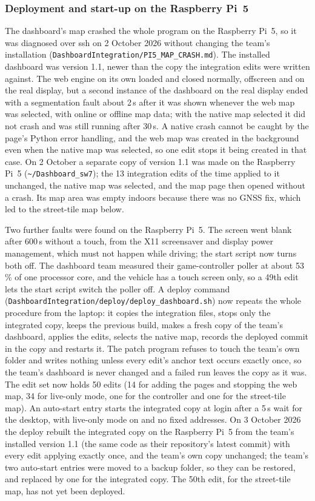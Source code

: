 \subsubsection*{Deployment and start-up on the Raspberry Pi~5}
\label{sec:pi5-deploy}
The dashboard's map crashed the whole program on the Raspberry Pi~5, so it was diagnosed over ssh on 2 October 2026 without changing the team's installation (\texttt{DashboardIntegration/PI5\_MAP\_CRASH.md}). The installed dashboard was version 1.1, newer than the copy the integration edits were written against. The web engine on its own loaded and closed normally, offscreen and on the real display, but a second instance of the dashboard on the real display ended with a segmentation fault about 2\,s after it was shown whenever the web map was selected, with online or offline map data; with the native map selected it did not crash and was still running after 30\,s. A native crash cannot be caught by the page's Python error handling, and the web map was created in the background even when the native map was selected, so one edit stops it being created in that case. On 2 October a separate copy of version 1.1 was made on the Raspberry Pi~5 (\texttt{\textasciitilde/Dashboard\_sw7}); the 13 integration edits of the time applied to it unchanged, the native map was selected, and the map page then opened without a crash. Its map area was empty indoors because there was no GNSS fix, which led to the street-tile map below.

Two further faults were found on the Raspberry Pi~5. The screen went blank after 600\,s without a touch, from the X11 screensaver and display power management, which must not happen while driving; the start script now turns both off. The dashboard team measured their game-controller poller at about 53\,\% of one processor core, and the vehicle has a touch screen only, so a 49th edit lets the start script switch the poller off. A deploy command (\texttt{DashboardIntegration/deploy/deploy\_dashboard.sh}) now repeats the whole procedure from the laptop: it copies the integration files, stops only the integrated copy, keeps the previous build, makes a fresh copy of the team's dashboard, applies the edits, selects the native map, records the deployed commit in the copy and restarts it. The patch program refuses to touch the team's own folder and writes nothing unless every edit's anchor text occurs exactly once, so the team's dashboard is never changed and a failed run leaves the copy as it was. The edit set now holds 50 edits (14 for adding the pages and stopping the web map, 34 for live-only mode, one for the controller and one for the street-tile map). An auto-start entry starts the integrated copy at login after a 5\,s wait for the desktop, with live-only mode on and no fixed addresses. On 3 October 2026 the deploy rebuilt the integrated copy on the Raspberry Pi~5 from the team's installed version 1.1 (the same code as their repository's latest commit) with every edit applying exactly once, and the team's own copy unchanged; the team's two auto-start entries were moved to a backup folder, so they can be restored, and replaced by one for the integrated copy. The 50th edit, for the street-tile map, has not yet been deployed.

